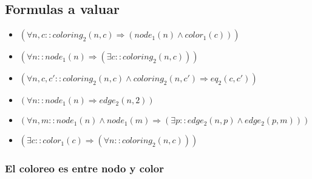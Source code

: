 \documentclass[a4paper,11pt]{article}
\begin{document}
\begin{center}
\end{center}

\subsection{Formulas a valuar}
\begin{itemize}
    \item $(\forall n, c :: coloring_2(n, c) \Rightarrow (node_1(n) \land color_1(c)))$
    \item $(\forall n :: node_1(n) \Rightarrow (\exists c :: coloring_2(n, c)))$
    \item $(\forall n, c, c' :: coloring_2(n, c) \land coloring_2(n, c') \Rightarrow eq_2(c, c'))$
    \item $(\forall n :: node_1(n) \Rightarrow edge_2(n, 2))$
    \item $(\forall n, m :: node_1(n) \land node_1(m) \Rightarrow (\exists p :: edge_2(n, p) \land edge_2(p, m)))$
    \item $(\exists c :: color_1(c) \Rightarrow (\forall n :: coloring_2(n, c)))$
\end{itemize}

\newpage
\subsubsection{El coloreo es entre nodo y color}
\end{document}
